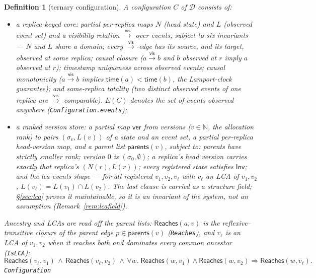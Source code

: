 \documentclass[11pt]{article}
\newtheorem{definition}[theorem]{Definition}
\newcommand{\vis}{\xrightarrow{\mathsf{vis}}}
\newcommand{\Sinit}{\sigma_0}
\newcommand{\lean}[1]{\texttt{#1}}
\newcommand{\M}[1]{\mathcal{#1}}
\newcommand{\Inv}{\mathsf{Inv}}
\begin{document}
\begin{definition}[ternary configuration]
\label{def:config}
A configuration $C$ of $\M{D}$ consists of:
\begin{itemize}[leftmargin=2em]
\item a \emph{replica-keyed core}: partial per-replica maps $N$ (head
  state) and $L$ (observed event set) and a visibility relation $\vis$
  over events, subject to six invariants --- $N$ and $L$ share a
  domain; every $\vis$-edge has its source, and its target, observed at
  some replica; causal closure ($a \vis b$ and $b$ observed at $r$
  imply $a$ observed at $r$); timestamp uniqueness across observed
  events; causal monotonicity ($a \vis b$ implies
  $\mathsf{time}(a) < \mathsf{time}(b)$, the Lamport-clock guarantee);
  and same-replica totality (two distinct observed events of one
  replica are $\vis$-comparable). $E(C)$ denotes the set of events
  observed anywhere (\lean{Configuration.events});
\item a \emph{ranked version store}: a partial map $\mathsf{ver}$ from
  versions ($v \in \mathbb{N}$, the allocation rank) to pairs
  $(\sigma_v, L(v))$ of a state and an event set, a partial per-replica
  head-version map, and a parent list $\mathsf{parents}(v)$, subject
  to: parents have strictly smaller rank; version $0$ is
  $(\Sinit, \emptyset)$; a replica's head version carries exactly that
  replica's $(N(r), L(r))$; every registered state satisfies $\Inv$;
  and the \emph{lca-events shape} --- for all registered $v_1, v_2,
  v_\ell$ with $v_\ell$ an LCA of $v_1, v_2$,
  $L(v_\ell) = L(v_1) \cap L(v_2)$. The last clause is carried as a
  structure field; \S\ref{sec:lca} proves it maintainable, so it is an
  invariant of the system, not an assumption
  (Remark~\ref{rem:lcafield}).
\end{itemize}
Ancestry and LCAs are read off the parent lists:
$\mathsf{Reaches}(a, v)$ is the reflexive--transitive closure of the
parent edge $p \in \mathsf{parents}(v)$ (\lean{Reaches}), and $v_\ell$
is an \emph{LCA} of $v_1, v_2$ when it reaches both and dominates every
common ancestor (\lean{IsLCA}):
\[
  \mathsf{Reaches}(v_\ell, v_1) \,\wedge\, \mathsf{Reaches}(v_\ell, v_2)
  \,\wedge\, \forall w.\;
  \mathsf{Reaches}(w, v_1) \wedge \mathsf{Reaches}(w, v_2)
  \Rightarrow \mathsf{Reaches}(w, v_\ell).
\]
\hfill\lean{Configuration}
\end{definition}
\end{document}
